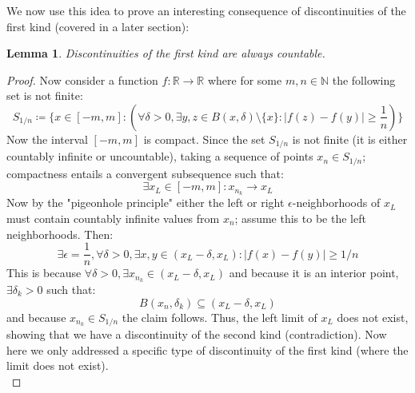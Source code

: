 \documentclass[10pt,letterpaper]{article} %
\newtheorem{lem}{Lemma}[section]
\begin{document}
We now use this idea to prove an interesting consequence of discontinuities of the first kind (covered in a later section):
\begin{lem}
Discontinuities of the first kind are always countable. 
\end{lem}
\begin{proof}
Now consider a function $f: \mathbb{R} \xrightarrow{} \mathbb{R}$ where for some $m, n \in \mathbb{N}$ the following set is not finite:
\begin{equation*}
S_{1/n} \coloneq \{x \in [-m, m] : (\forall \delta > 0, \exists y, z \in B(x, \delta)\setminus \{x\}: |f(z) - f(y)| \geqslant \frac{1}{n})\}
\end{equation*}
Now the interval $[-m, m]$ is compact. Since the set $S_{1/n}$ is not finite (it is either countably infinite or uncountable), taking a sequence of points $x_n \in S_{1/n}$; compactness entails a convergent subsequence such that:
\begin{equation*}
\exists x_L \in [-m, m]: x_{n_k} \xrightarrow{} x_L
\end{equation*}
Now by the "pigeonhole principle" either the left or right $\epsilon$-neighborhoods of $x_L$ must contain countably infinite values from $x_n$; assume this to be the left neighborhoods. Then:
\begin{equation*}
\exists \epsilon = \frac{1}{n}, \forall \delta > 0, \exists x, y \in (x_L - \delta, x_L): |f(x) - f(y)| \geqslant  1/n
\end{equation*}
This is because $\forall \delta > 0, \exists x_{n_k} \in (x_L - \delta, x_L)$ and because it is an interior point, $\exists \delta_{k} > 0$ such that:
\begin{equation*}
B(x_n, \delta_{k}) \subseteq (x_L - \delta, x_L)
\end{equation*}
and because $x_{n_k} \in S_{1/n}$ the claim follows. Thus, the left limit of $x_L$ does not exist, showing that we have a discontinuity of the second kind (contradiction). Now here we only addressed a specific type of discontinuity of the first kind (where the limit does not exist).\\


\end{proof}
\end{document}
